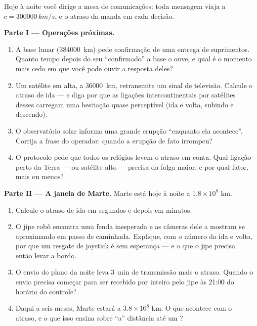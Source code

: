 \begin{problem}\label{pb:g8:speed-of-light:1}
Hoje à noite você dirige a mesa de comunicações: toda mensagem viaja a
$c = \qty{300000}{km/s}$, e o atraso da  manda em cada decisão.

\medskip\noindent\textbf{Parte I --- Operações próximas.}
\begin{enumerate}
  \item A base lunar (\qty{384000}{km}) pede confirmação de uma
        entrega de suprimentos. Quanto tempo depois do seu
        ``confirmado'' a base o ouve, e qual é o momento mais cedo em
        que você pode ouvir a resposta deles?
  \item Um satélite em  alta, a \qty{36000}{km}, retransmite um
        sinal de televisão. Calcule o atraso de ida --- e diga por que
        as ligações intercontinentais por satélites desses carregam
        uma hesitação quase perceptível (ida e volta, subindo e
        descendo).
  \item O observatório solar informa uma grande erupção ``enquanto
        ela acontece''. Corrija a frase do operador: quando a erupção
        de fato irrompeu?
  \item O protocolo pede que todos os relógios levem o atraso em
        conta. Qual ligação perto da Terra ---  ou satélite alto
        --- precisa da folga maior, e por qual fator, mais ou menos?
\end{enumerate}

\medskip\noindent\textbf{Parte II --- A janela de Marte.}
Marte está hoje à noite a $1.8 \times 10^{8}$ km.
\begin{enumerate}[resume]
  \item Calcule o atraso de ida em segundos e depois em minutos.
  \item O jipe robô encontra uma fenda inesperada e as câmeras dele a
        mostram se aproximando em passo de caminhada. Explique, com o
        número da ida e volta, por que um resgate de joystick é sem
        esperança --- e o que o jipe precisa então levar a bordo.
  \item O envio do plano da noite leva \qty{3}{min} de transmissão
        mais o atraso. Quando o envio precisa começar para ser
        recebido por inteiro pelo jipe às 21:00 do horário do
        controle?
  \item Daqui a seis meses, Marte estará a $3.8 \times 10^{8}$ km. O
        que acontece com o atraso, e o que isso ensina sobre ``a''
        distância até um ?
\end{enumerate}


\end{problem}

